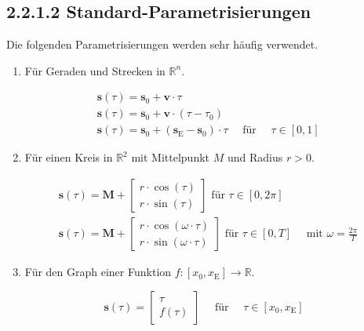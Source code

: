 \documentclass[10pt]{article}
\begin{document}
\subsection*{2.2.1.2 Standard-Parametrisierungen}
Die folgenden Parametrisierungen werden sehr häufig verwendet.

\begin{enumerate}
  \item Für Geraden und Strecken in $\mathbb{R}^{n}$.
\end{enumerate}


\begin{align*}
& \mathbf{s}(\tau)=\mathbf{s}_{0}+\mathbf{v} \cdot \tau  \tag{2.43}\\
& \mathbf{s}(\tau)=\mathbf{s}_{0}+\mathbf{v} \cdot\left(\tau-\tau_{0}\right)  \tag{2.44}\\
& \mathbf{s}(\tau)=\mathbf{s}_{0}+\left(\mathbf{s}_{\mathrm{E}}-\mathbf{s}_{0}\right) \cdot \tau \quad \text { für } \quad \tau \in[0,1] \tag{2.45}
\end{align*}


\begin{enumerate}
  \setcounter{enumi}{1}
  \item Für einen Kreis in $\mathbb{R}^{2}$ mit Mittelpunkt $M$ und Radius $r>0$.
\end{enumerate}


\begin{align*}
& \mathbf{s}(\tau)=\mathbf{M}+\left[\begin{array}{l}
r \cdot \cos (\tau) \\
r \cdot \sin (\tau)
\end{array}\right] \text { für } \tau \in[0,2 \pi]  \tag{2.46}\\
& \mathbf{s}(\tau)=\mathbf{M}+\left[\begin{array}{c}
r \cdot \cos (\omega \cdot \tau) \\
r \cdot \sin (\omega \cdot \tau)
\end{array}\right] \text { für } \tau \in[0, T] \quad \text { mit } \omega=\frac{2 \pi}{T} \tag{2.47}
\end{align*}


\begin{enumerate}
  \setcounter{enumi}{2}
  \item Für den Graph einer Funktion $f:\left[x_{0}, x_{\mathrm{E}}\right] \rightarrow \mathbb{R}$.
\end{enumerate}

\[
\mathbf{s}(\tau)=\left[\begin{array}{c}
\tau  \tag{2.48}\\
f(\tau)
\end{array}\right] \quad \text { für } \quad \tau \in\left[x_{0}, x_{\mathrm{E}}\right]
\]
\end{document}

